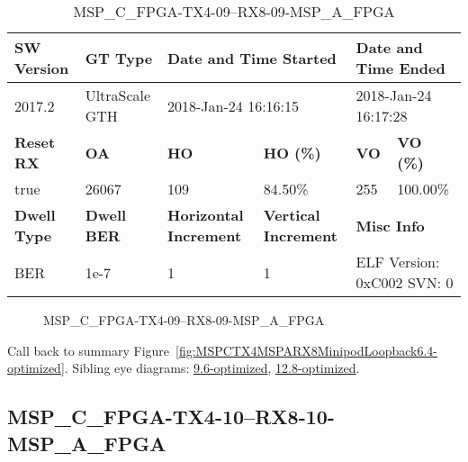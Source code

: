 \begin{table}[h]
\centering
\caption{MSP\_C\_FPGA-TX4-09--RX8-09-MSP\_A\_FPGA}
\label{tab:MSPCFPGATX409RX809MSPAFPGA6.4-optimized}
\begin{tabular}{@{}|l|l|l|l|l|l|@{}}
\toprule
\textbf{SW Version}                & \textbf{GT Type}   & \multicolumn{2}{l|}{\textbf{Date and Time Started}}            & \multicolumn{2}{l|}{\textbf{Date and Time Ended}}        \\ \midrule
2017.2                       & UltraScale GTH          & \multicolumn{2}{l|}{2018-Jan-24 16:16:15}                   & \multicolumn{2}{l|}{2018-Jan-24 16:17:28}               \\ \midrule
\textbf{Reset RX}                  & \textbf{OA} & \textbf{HO}   & \textbf{HO (\%)} & \textbf{VO} & \textbf{VO (\%)} \\ \midrule
true & 26067        & 109          & 84.50\%        & 255        & 100.00\%       \\ \midrule
\textbf{Dwell Type}                & \textbf{Dwell BER} & \textbf{Horizontal Increment} & \textbf{Vertical Increment}    & \multicolumn{2}{l|}{\textbf{Misc Info}}                  \\ \midrule
BER                            & 1e-7        & 1        & 1           & \multicolumn{2}{l|}{ELF Version: 0xC002 SVN: 0}                         \\ \bottomrule
\end{tabular}
\end{table}

\begin{figure}[h]
\caption{MSP\_C\_FPGA-TX4-09--RX8-09-MSP\_A\_FPGA} \label{fig:MSPCFPGATX409RX809MSPAFPGA6.4-optimized}
\end{figure}

Call back to summary Figure~\ref{fig:MSPCTX4MSPARX8MinipodLoopback6.4-optimized}.
Sibling eye diagrams: \hyperref[sec:MSPCFPGATX409RX809MSPAFPGA9.6-optimized]{9.6-optimized}, \hyperref[sec:MSPCFPGATX409RX809MSPAFPGA12.8-optimized]{12.8-optimized}.

\clearpage
\newpage


\subsection{MSP\_C\_FPGA-TX4-10--RX8-10-MSP\_A\_FPGA}\label{sec:MSPCFPGATX410RX810MSPAFPGA6.4-optimized}


